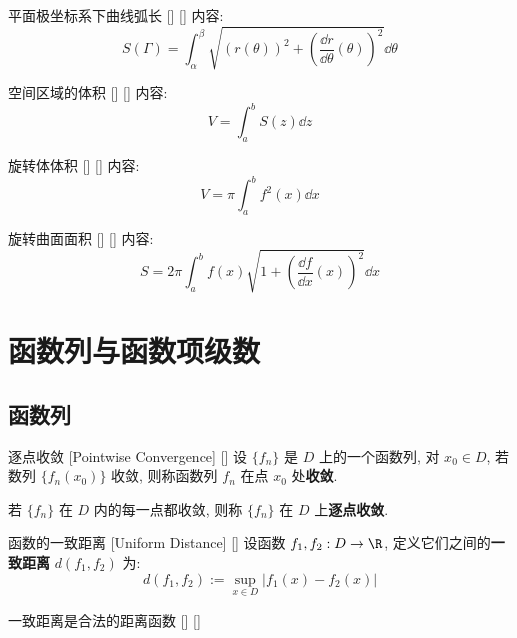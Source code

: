 \documentclass[UTF8]{ctexart}
\begin{document}
			\begin{crl}
			    []
			    {平面极坐标系下曲线弧长}
			    []
			    []
				内容: 
				\[S(\varGamma)=\int_\alpha^\beta\sqrt{{(r(\theta))}^2+{\left(\frac{\dd r}{\dd\theta}(\theta)\right)}^2}\dd\theta\]
			\end{crl}

			\begin{thm}
			    []
			    {空间区域的体积}
			    []
			    []
				内容: 
				\[V=\int_a^b S(z)\dd z\]
			\end{thm}

			\begin{crl}
			    []
			    {旋转体体积}
			    []
			    []
				内容: 
				\[V=\pi\int_a^b f^2(x)\dd x\]
			\end{crl}

			\begin{thm}
			    []
			    {旋转曲面面积}
			    []
			    []
				内容: 
				\[S=2\pi\int_a^b f(x)\sqrt{1+\left(\frac{\dd f}{\dd x}(x)\right)^2}\dd x\]
			\end{thm}

	\section{函数列与函数项级数}

		\subsection{函数列}

			\begin{dfn}
			    []
			    {逐点收敛 }
			    [Pointwise Convergence]
			    []
				设 \(\{f_n\}\) 是 \(D\) 上的一个函数列, 对 \(x_0\in D\), 若数列 \(\{f_n(x_0)\}\) 收敛, 则称函数列 \(f_n\) 在点 \(x_0\) 处\textbf{收敛}. 
				
				若 \(\{f_n\}\) 在 \(D\) 内的每一点都收敛, 则称 \(\{f_n\}\) 在 \(D\) 上\textbf{逐点收敛}. 
			\end{dfn}

			\begin{dfn}
			    []
			    {函数的一致距离 }
			    [Uniform Distance]
			    []
				设函数 \(f_1,f_2:D\to\R\), 定义它们之间的\textbf{一致距离} \(d(f_1,f_2)\) 为: 
				\[d(f_1,f_2):=\sup_{x\in D}|f_1(x)-f_2(x)|\]
			\end{dfn}

			\begin{ppt}
			    []
			    {一致距离是合法的距离函数}
			    []
			    []
			\end{ppt}
\end{document}
